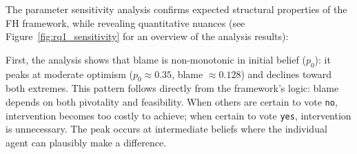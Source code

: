 \documentclass{article}
\begin{document}


The parameter sensitivity analysis confirms expected structural properties of the FH framework, while revealing quantitative nuances (see Figure~\ref{fig:rq1_sensitivity} for an overview of the analysis results): 

First, the analysis shows that blame is non-monotonic in initial belief ($p_0$): it peaks at moderate optimism ($p_0 \approx 0.35$, blame $\approx 0.128$) and declines toward both extremes. This pattern follows directly from the framework's logic: blame depends on both pivotality and feasibility. When others are certain to vote \texttt{no}, intervention becomes too costly to achieve; when certain to vote \texttt{yes}, intervention is unnecessary. The peak occurs at intermediate beliefs where the individual agent can plausibly make a difference.
\end{document}
